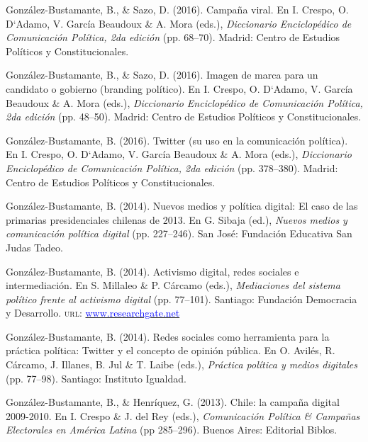 \begin{publications}
\begin{benumerate}{12}
\item{González-Bustamante, B., \& Sazo, D. (2016). Campaña viral. En I. Crespo, O. D`Adamo, V. García Beaudoux \& A. Mora (eds.), {\itshape Diccionario Enciclopédico de Comunicación Política, 2da edición} (pp. 68--70). Madrid: Centro de Estudios Políticos y Constitucionales.}\vspace{1mm}

\item{González-Bustamante, B., \& Sazo, D. (2016). Imagen de marca para un candidato o gobierno (branding político). En I. Crespo, O. D`Adamo, V. García Beaudoux \& A. Mora (eds.), {\itshape Diccionario Enciclopédico de Comunicación Política, 2da edición} (pp. 48--50). Madrid: Centro de Estudios Políticos y Constitucionales.}\vspace{1mm}

\item{González-Bustamante, B. (2016). Twitter (su uso en la comunicación política). En I. Crespo, O. D`Adamo, V. García Beaudoux \& A. Mora (eds.), {\itshape Diccionario Enciclopédico de Comunicación Política, 2da edición} (pp. 378--380). Madrid: Centro de Estudios Políticos y Constitucionales.}\vspace{1mm}

\item{González-Bustamante, B. (2014). Nuevos medios y política digital: El caso de las primarias presidenciales chilenas de 2013. En G. Sibaja (ed.), {\itshape Nuevos  medios y comunicación política digital} (pp. 227--246). San José: Fundación Educativa San Judas Tadeo.}\vspace{1mm}

\item{González-Bustamante, B. (2014). Activismo digital, redes sociales e intermediación. En S. Millaleo \& P. C\'arcamo (eds.), {\itshape Mediaciones del  sistema político frente al activismo digital} (pp. 77--101). Santiago: Fundación Democracia y Desarrollo. {\scshape url:} \href{https://www.researchgate.net/publication/321992867_Activismo_digital_redes_sociales_e_intermediacion}{\textcolor{blue}{www.researchgate.net}}}\vspace{1mm}

\item{González-Bustamante, B. (2014). Redes sociales como herramienta para la práctica política: Twitter y el concepto de opinión pública. En O. Avilés, R. Cárcamo, J. Illanes, B. Jul \& T. Laibe (eds.), {\itshape Práctica política y medios digitales} (pp. 77--98). Santiago: Instituto Igualdad.}\vspace{1mm}

\item{González-Bustamante, B., \& Henríquez, G. (2013). Chile: la campaña digital 2009-2010. En I. Crespo \& J. del Rey (eds.), {\itshape Comunicación Política \& Campañas Electorales en América Latina} (pp 285--296). Buenos Aires: Editorial Biblos.}\vspace{1mm}

\end{benumerate}

\end{publications}
\pagebreak